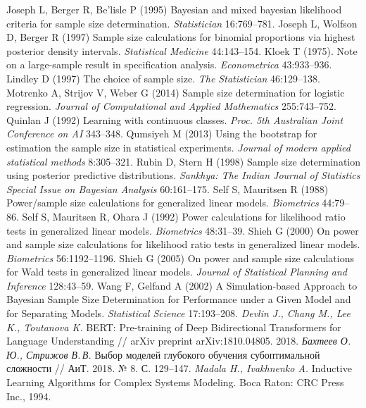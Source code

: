 \begin{thebibliography}{10}
	Joseph L, Berger R, Be'lisle P (1995) Bayesian and mixed bayesian likelihood criteria for sample size determination. \textit{Statistician} 16:769--781.
	Joseph L, Wolfson D, Berger R (1997) Sample size calculations for binomial proportions via highest posterior density intervals. \textit{Statistical Medicine} 44:143--154.
	Kloek T (1975). Note on a large-sample result in specification analysis. \textit{Econometrica} 43:933--936.
	Lindley D (1997) The choice of sample size. \textit{The Statistician} 46:129--138.
	Motrenko A, Strijov V, Weber G (2014) Sample size determination for logistic regression. \textit{Journal of Computational and Applied Mathematics} 255:743--752.
	Quinlan J (1992) Learning with continuous classes. \textit{Proc. 5th Australian Joint Conference on AI} 343--348.
	Qumsiyeh M (2013) Using the bootstrap for estimation the sample size in statistical experiments. \textit{Journal of modern applied statistical methods} 8:305--321.
	Rubin D, Stern H (1998) Sample size determination using posterior predictive distributions. \textit{Sankhya: The Indian Journal of Statistics Special Issue on Bayesian Analysis} 60:161--175.
	Self S, Mauritsen R (1988) Power/sample size calculations for generalized linear models. \textit{Biometrics} 44:79--86.
	Self S, Mauritsen R, Ohara J (1992) Power calculations for likelihood ratio tests in generalized linear models. \textit{Biometrics} 48:31--39.
	Shieh G (2000) On power and sample size calculations for likelihood ratio tests in generalized linear models. \textit{Biometrics} 56:1192--1196.
	Shieh G (2005) On power and sample size calculations for Wald tests in generalized linear models. \textit{Journal of Statistical Planning and Inference} 128:43--59.
	Wang F, Gelfand A (2002) A Simulation-based Approach to Bayesian Sample Size Determination for Performance under a Given Model and for Separating Models. \textit{Statistical Science} 17:193--208.
	\textit{Devlin J., Chang M., Lee K., Toutanova K.} BERT: Pre-training of Deep Bidirectional Transformers for Language Understanding // arXiv preprint arXiv:1810.04805. 2018.
	\textit{Бахтеев О.\,Ю., Стрижов В.\,В.} Выбор моделей глубокого обучения субоптимальной сложности // АиТ. 2018. № 8. С. 129--147.
	\textit{Madala H., Ivakhnenko A.} Inductive Learning Algorithms for Complex Systems Modeling. Boca Raton: CRC Press Inc., 1994.

\end{thebibliography}

